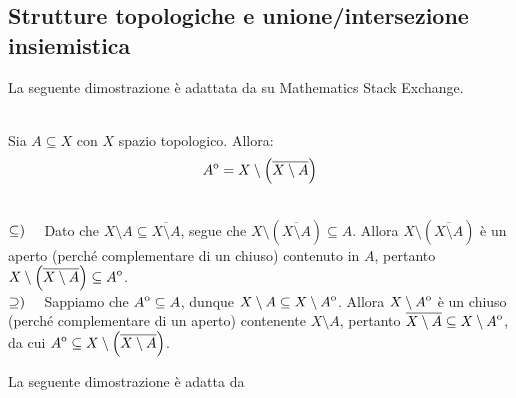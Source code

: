 \subsection{Strutture topologiche e unione/intersezione insiemistica}
La seguente dimostrazione è adattata da \cite{shalop:interior} su Mathematics Stack Exchange.
\begin{lemming}~{}\\
Sia $A\subseteq X$ con $X$ spazio topologico. Allora:
\begin{equation}
	{\kern0ptA}^{\mathrm{o}}=X\setminus\left(\overline{X\setminus A}\right)
\end{equation}
\vspace{-6mm}
\end{lemming}
\begin{demonstration}~{}\\
$\subseteq)\quad$ Dato che $X\setminus A\subseteq \overline{X\setminus A}$, segue che $X\setminus \left(\overline{X\setminus A}\right)\subseteq A$. Allora $X\setminus \left(\overline{X\setminus A}\right)$ è un aperto (perché complementare di un chiuso) contenuto in $A$, pertanto $X\setminus \left(\overline{X\setminus A}\right)\subseteq {\kern0ptA}^{\mathrm{o}}$.\\
$\supseteq)\quad$ Sappiamo che ${\kern0ptA}^{\mathrm{o}}\subseteq A$, dunque $X\setminus A\subseteq X\setminus {\kern0ptA}^{\mathrm{o}}$. Allora $X\setminus {\kern0ptA}^{\mathrm{o}}$ è un chiuso (perché complementare di un aperto) contenente $X\setminus A$, pertanto $\overline{X\setminus A}\subseteq X\setminus {\kern0ptA}^{\mathrm{o}}$, da cui ${\kern0ptA}^{\mathrm{o}}\subseteq X\setminus\left(\overline{X\setminus A}\right)$.
\end{demonstration}
La seguente dimostrazione è adatta da 
